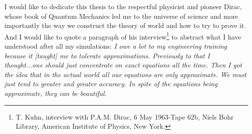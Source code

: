 
\begin{dedication} 
I would like to dedicate this thesis to the respectful physicist and pioneer  Dirac, whose book of Quantum Mechanics led me to the universe of science and more importantly the way we construct the theory of world and how to try to prove it. And I would like to quote a paragraph of his interview\footnote{T. Kuhn, interview with P.A.M. Dirac, 6 May 1963-Tape 62b, Niels Bohr Library, American Institute of Physics, New York.} to abstract what I have understood after all my simulations:
\textit{I owe a lot to my engineering training because it [taught] me to tolerate approximations. Previously to that I thought...one should just concentrate on exact equations all the time. Then I got the idea that in the actual world all our equations are only approximate. We must just tend to greater and greater accuracy. In spite of the equations being approximate, they can be beautiful.}
\end{dedication}